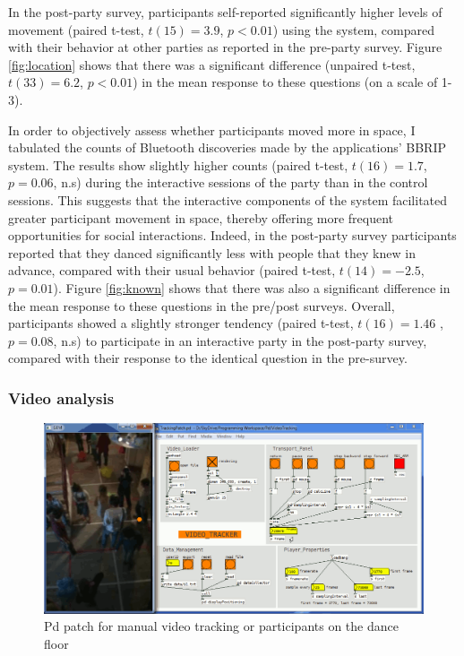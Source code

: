 \documentclass[a4paper,11pt]{article}
\begin{document}
{In the post-party survey, participants self-reported significantly higher levels of movement (paired t-test, $t(15)=3.9$, $p<0.01$) using the system, compared with their behavior at other parties as reported in the pre-party survey.
Figure \ref{fig:location} shows that there was a significant difference (unpaired t-test, $t(33)=6.2$, $p<0.01$) in the mean response to these questions (on a scale of 1-3).

In order to objectively assess whether participants moved more in space, I tabulated the counts of Bluetooth discoveries made by the applications' BBRIP system.
The results show slightly higher counts (paired t-test, $t(16)=1.7$, $p=0.06$, n.s) during the interactive sessions of the party than in the control sessions.
This suggests that the interactive components of the system facilitated greater participant movement in space, thereby offering more frequent opportunities for social interactions.
Indeed, in the post-party survey participants reported that they danced significantly less with people that they knew in advance, compared with their usual behavior (paired t-test, $t(14)=-2.5$, $p=0.01$).
Figure \ref{fig:known} shows that there was also a significant difference in the mean response to these questions in the pre/post surveys.
Overall, participants showed a slightly stronger tendency (paired t-test, $t(16)=1.46$ ,$p=0.08$, n.s) to participate in an interactive party in the post-party survey, compared with their response to the identical question in the pre-survey.

\subsubsection{Video analysis}\label{exp1:results:video}

\begin{figure}[!htb]
	\includegraphics[width=\linewidth]{tracking}
        \caption{Pd patch for manual video tracking or participants on the dance floor}\label{fig:tracking}
\end{figure}

}
\end{document}
